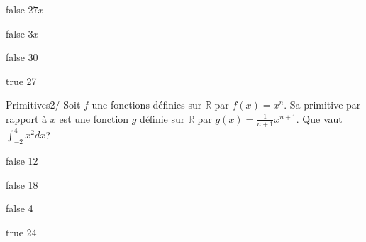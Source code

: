 \documentclass[11pt]{article}
\begin{document}
            \begin{reponses}
            	\item[false] $27x$
            	\item[false] $3x$
                \item[false] 30
                \item[true] 27
            \end{reponses}
			
            \begin{question}{60}{Primitives}{2}{/}
                Soit $f$ une fonctions définies sur $\mathbb{R}$ par $f(x)=x^n$. Sa primitive par rapport à $x$ est une fonction $g$ définie sur $\mathbb{R}$ par $g(x)=\frac{1}{n+1}x^{n+1}$. Que vaut $\int_{-2}^4 x^2 dx$?
            \end{question}

            \begin{reponses}
                \item[false] 12
                \item[false] 18
                \item[false] 4
                \item[true] 24
            \end{reponses}
\end{document}
